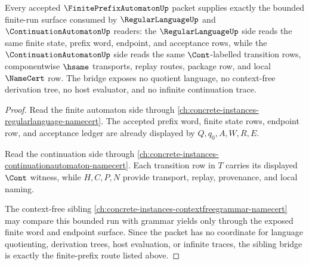 \begin{theorem}
\label{thm:finiteprefixautomaton-regularlanguage-sibling-bridge}
Every accepted $\FinitePrefixAutomatonUp$ packet supplies exactly the bounded finite-run surface consumed by $\RegularLanguageUp$ and $\ContinuationAutomatonUp$ readers: the $\RegularLanguageUp$ side reads the same finite state, prefix word, endpoint, and acceptance rows, while the $\ContinuationAutomatonUp$ side reads the same $\Cont$-labelled transition rows, componentwise $\hsame$ transports, replay routes, package row, and local $\NameCert$ row. The bridge exposes no quotient language, no context-free derivation tree, no host evaluator, and no infinite continuation trace.
\end{theorem}
\begin{proof}
Read the finite automaton side through \autoref{ch:concrete-instances-regularlanguage-namecert}. The accepted prefix word, finite state rows, endpoint row, and acceptance ledger are already displayed by $Q,q_0,A,W,R,E$.

Read the continuation side through \autoref{ch:concrete-instances-continuationautomaton-namecert}. Each transition row in $T$ carries its displayed $\Cont$ witness, while $H,C,P,N$ provide transport, replay, provenance, and local naming.

The context-free sibling \autoref{ch:concrete-instances-contextfreegrammar-namecert} may compare this bounded run with grammar yields only through the exposed finite word and endpoint surface. Since the packet has no coordinate for language quotienting, derivation trees, host evaluation, or infinite traces, the sibling bridge is exactly the finite-prefix route listed above.
\end{proof}

